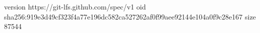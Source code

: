 version https://git-lfs.github.com/spec/v1
oid sha256:919e3d49cf323f4a77e196dc582ca527262af0f99aee92144e104a0f9c28e167
size 87544
